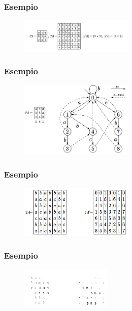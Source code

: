 \documentclass{beamer}
\begin{document}
\begin{frame}
\frametitle{Esempio}

\begin{figure}[p]
    \includegraphics[width=0.5\textwidth]{Baker_Bird_1.png}
\end{figure}
\end{frame}

\begin{frame}
\frametitle{Esempio}

\begin{figure}[p]
    \includegraphics[width=0.5\textwidth]{Baker_Bird_2.png}
\end{figure}
\end{frame}

\begin{frame}
\frametitle{Esempio}

\begin{figure}[p]
    \includegraphics[width=0.5\textwidth]{Baker_Bird_3.png}
\end{figure}
\end{frame}

\begin{frame}
\frametitle{Esempio}

\begin{figure}[p]
    \includegraphics[width=0.4\textwidth]{Baker_Bird_4.png}
\end{figure}
\end{frame}
\end{document}
